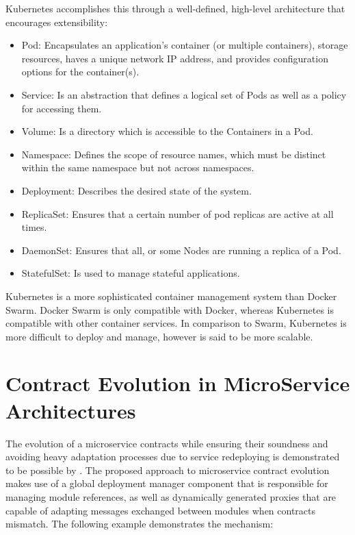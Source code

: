 Kubernetes accomplishes this through a well-defined, high-level architecture that encourages extensibility:

\begin{itemize}
    \item Pod: Encapsulates an application's container (or multiple containers),
    storage resources, haves a unique network IP address, and provides configuration options for the container(s).
    \item Service: Is an abstraction that defines a logical set of Pods as well as a policy for accessing them.
    \item Volume: Is a directory which is accessible to the
    Containers in a Pod.
    \item Namespace: Defines the scope of resource names, which must be distinct within the same namespace but not across namespaces.
    \item Deployment: Describes the desired state of the system.
    \item ReplicaSet: Ensures that a certain number of pod replicas are active at all times.
    \item DaemonSet: Ensures that all, or some Nodes are running a replica of a Pod.
    \item StatefulSet: Is used to manage stateful applications.
\end{itemize}

Kubernetes is a more sophisticated container management system than Docker Swarm.
Docker Swarm is only compatible with Docker, whereas Kubernetes is compatible with other container services.
In comparison to Swarm, Kubernetes is more difficult to deploy and manage, however is said to be more scalable.


\section{Contract Evolution in MicroService Architectures} %
\label{sec:contract_evolution_in_microservice_architectures}

The evolution of a microservice contracts while ensuring their soundness and
avoiding heavy adaptation processes due to service redeploying is demonstrated to be possible by \citeauthor{seco2020robust} \cite{seco2020robust}.
The proposed approach to microservice contract evolution \cite{seco2020robust} makes use of a global deployment manager component that is responsible for managing module references,
as well as dynamically generated proxies that are capable of adapting messages exchanged between modules when contracts mismatch.
The following example demonstrates the mechanism:

